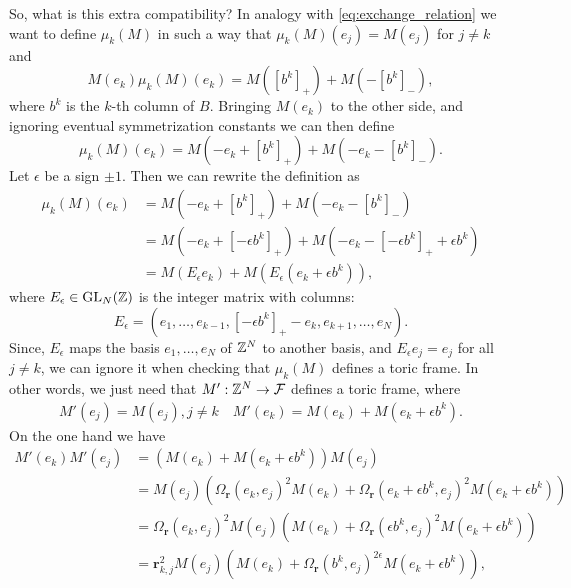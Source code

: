 \documentclass{article}
\begin{document}
So, what is this extra compatibility? In analogy with \cref{eq:exchange_relation} we
want to define $\mu_k(M)$ in such a way that $\mu_k(M)(e_j) = M(e_j)$ for $j \neq k$
and
\begin{equation*}
	M(e_k)\mu_k(M)(e_k) = M([b^k]_+) + M(-[b^k]_-),
\end{equation*}
where $b^k$ is the $k$-th column of $B$.
Bringing $M(e_k)$ to the other side,
and ignoring eventual symmetrization constants we can then define
\begin{equation*}
	\mu_k(M)(e_k) = M(-e_k + [b^k]_+) + M(-e_k - [b^k]_-).
\end{equation*}
Let $\epsilon$ be a sign $\pm 1$. Then we can rewrite the definition as
\begin{align*}
	\mu_k(M)(e_k)
	 & = M(-e_k + [b^k]_+) + M(-e_k - [b^k]_-)                                    \\
	 & = M(-e_k + [-\epsilon b^k]_+) + M(-e_k - [-\epsilon b^k]_+ + \epsilon b^k) \\
	 & = M(E_\epsilon e_k) + M(E_\epsilon(e_k + \epsilon b^k)),
\end{align*}
where $E_\epsilon \in \operatorname{GL}_N(\mathbb{Z})$ is the integer matrix with columns:
\begin{equation*}
	E_\epsilon = (e_1, \dots ,e_{k-1}, [-\epsilon b^k]_+ -e_k, e_{k+1}, \dots, e_N).
\end{equation*}
Since, $E_\epsilon$ maps the basis $e_1, \dots, e_N$ of $\mathbb{Z}^N$ to another basis,
and $E_\epsilon e_j = e_j$ for all $j \neq k$,
we can ignore it when checking that $\mu_k(M)$ defines a toric frame.
In other words,
we just need that $M' : \mathbb{Z}^N \to \mathcal{F}$ defines a toric frame, where
\begin{align*}
	M'(e_j) = M(e_j), j\neq k \quad M'(e_k) = M(e_k) + M(e_k + \epsilon b^k).
\end{align*}
On the one hand we have
\begin{align*}
	M'(e_k)M'(e_j)
	 & = (M(e_k) + M(e_k + \epsilon b^k))M(e_j)                                                                                \\
	 & = M(e_j)(\Omega_{\mathbf{r}}(e_k, e_j)^2 M(e_k) + \Omega_{\mathbf{r}}(e_k + \epsilon b^k, e_j)^2 M(e_k + \epsilon b^k)) \\
	 & =\Omega_{\mathbf{r}}(e_k, e_j)^2  M(e_j)(M(e_k) + \Omega_{\mathbf{r}}(\epsilon b^k, e_j)^2 M(e_k + \epsilon b^k))       \\
	 & =\mathbf{r}_{k,j}^2  M(e_j)(M(e_k) + \Omega_{\mathbf{r}}(b^k, e_j)^{2 \epsilon} M(e_k + \epsilon b^k)),
\end{align*}
\end{document}
